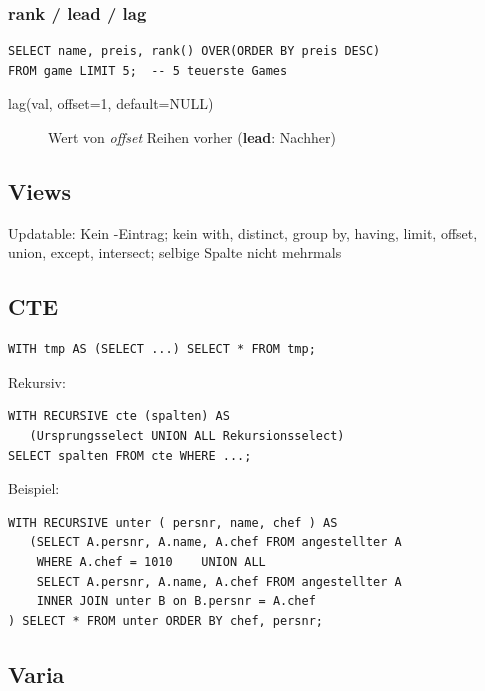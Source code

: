 \begin{multicols*}{3}
\subsubsection{rank / lead / lag}
\begin{verbatim}
SELECT name, preis, rank() OVER(ORDER BY preis DESC)
FROM game LIMIT 5;  -- 5 teuerste Games
\end{verbatim}

\begin{description}
  \item[lag(val, offset=1, default=NULL)]{Wert von \emph{offset} Reihen vorher
      (\textbf{lead}: Nachher)}
\end{description}

\subsection{Views}

Updatable: Kein -Eintrag; kein with, distinct, group by, having,
limit, offset, union, except, intersect; selbige Spalte nicht mehrmals

\subsection{CTE}
\begin{verbatim}
WITH tmp AS (SELECT ...) SELECT * FROM tmp;
\end{verbatim}

Rekursiv:

\begin{verbatim}
WITH RECURSIVE cte (spalten) AS
   (Ursprungsselect UNION ALL Rekursionsselect)
SELECT spalten FROM cte WHERE ...;
\end{verbatim}

Beispiel:

\begin{verbatim}
WITH RECURSIVE unter ( persnr, name, chef ) AS
   (SELECT A.persnr, A.name, A.chef FROM angestellter A
    WHERE A.chef = 1010    UNION ALL
    SELECT A.persnr, A.name, A.chef FROM angestellter A
    INNER JOIN unter B on B.persnr = A.chef
) SELECT * FROM unter ORDER BY chef, persnr;
\end{verbatim}

\subsection{Varia}


\end{multicols*}
